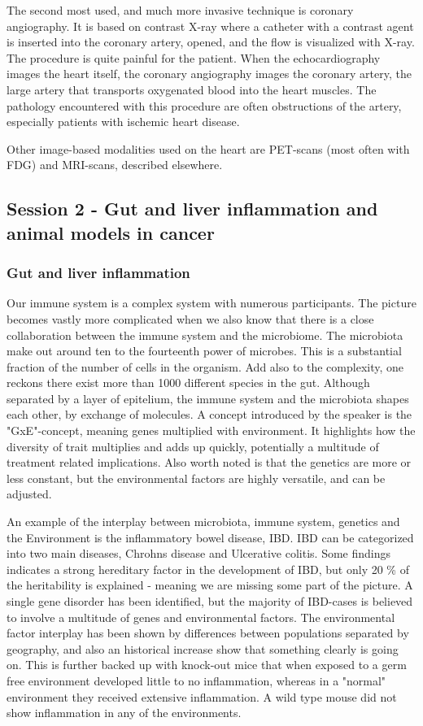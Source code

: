 \documentclass[12p]{article}
\begin{document}
The second most used, and much more invasive technique is coronary angiography.
It is based on contrast X-ray where a catheter with a contrast agent is inserted into the coronary artery, opened, and the flow is visualized with X-ray.
The procedure is quite painful for the patient.
When the echocardiography images the heart itself, the coronary angiography images the coronary artery, the large artery that transports oxygenated blood into the heart muscles.
The pathology encountered with this procedure are often obstructions of the artery, especially patients with ischemic heart disease. 

Other image-based modalities used on the heart are PET-scans (most often with FDG) and MRI-scans, described elsewhere.

\subsection*{Session 2 - Gut and liver inflammation and animal models in cancer}

\subsubsection{Gut and liver inflammation}

Our immune system is a complex system with numerous participants.
The picture becomes vastly more complicated when we also know that there is a close collaboration between the immune system and the microbiome.
The microbiota make out around ten to the fourteenth power of microbes.
This is a substantial fraction of the number of cells in the organism.
Add also to the complexity, one reckons there exist more than 1000 different species in the gut.
Although separated by a layer of epitelium, the immune system and the microbiota shapes each other, by exchange of molecules.
A concept introduced by the speaker is the "GxE"-concept, meaning genes multiplied with environment.
It highlights how the diversity of trait multiplies and adds up quickly, potentially a multitude of treatment related implications.
Also worth noted is that the genetics are more or less constant, but the environmental factors are highly versatile, and can be adjusted.

An example of the interplay between microbiota, immune system, genetics and the Environment is the inflammatory bowel disease, IBD.
IBD can be categorized into two main diseases, Chrohns disease and Ulcerative colitis.
Some findings indicates a strong hereditary factor in the development of IBD, but only 20 \% of the heritability is explained - meaning we are missing some part of the picture.
A single gene disorder has been identified, but the majority of IBD-cases is believed to involve a multitude of genes and environmental factors.
The environmental factor interplay has been shown by differences between populations separated by geography, and also an historical increase show that something clearly is going on.
This is further backed up with knock-out mice that when exposed to a germ free environment developed little to no inflammation, whereas in a "normal" environment they received extensive inflammation.
A wild type mouse did not show inflammation in any of the environments.
\end{document}
